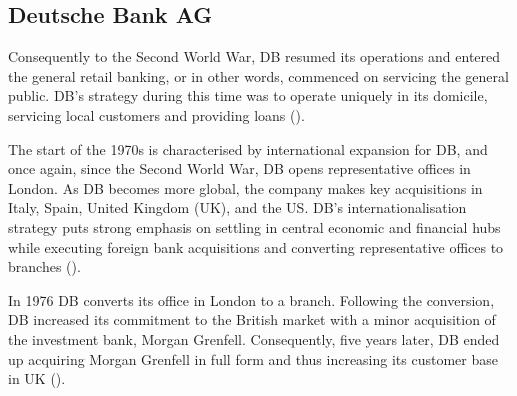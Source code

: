 \documentclass[11pt,a4paper]{article}
\begin{document}
{{\subsection{Deutsche Bank AG}
\vspace{-1mm}
 \par
Consequently to the Second World War, DB resumed its operations and entered the general retail banking, or in other words, commenced on servicing the general public. DB's strategy during this time was to operate uniquely in its domicile, servicing local customers and providing loans (\cite{kobrakBankingGlobalMarkets2008}).  \par
The start of the 1970s  is characterised by international expansion for DB, and once again, since the Second World War, DB opens representative offices in London. As DB becomes more global, the company makes key acquisitions in Italy, Spain, United Kingdom (UK), and the US. DB's internationalisation strategy puts strong emphasis on settling in central economic and financial hubs while executing foreign bank acquisitions and converting representative offices to branches (\cite{InternationalizationDeutscheBank}). \par
In 1976 DB converts its office in London to a branch. Following the conversion, DB increased its commitment to the British market with a minor acquisition of the investment bank, Morgan Grenfell. Consequently, five years later, DB ended up acquiring Morgan Grenfell in full form and thus increasing its customer base in UK (\cite{deutschebankagDeutscheBankUnited}). \par %
}}
\end{document}
